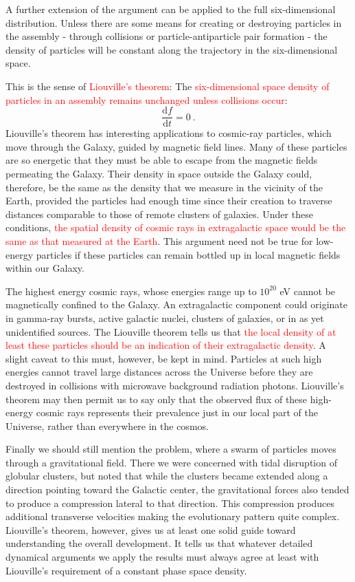 \documentclass[12pt,a4paper]{article}
\newcommand{\dif}{\mathrm{d}}
\newcounter{theo}[section]\setcounter{theo}{0}
\begin{document}
A further extension of the argument can be applied to the full six-dimensional distribution. Unless there are some means for creating or destroying particles in the assembly - through collisions or particle-antiparticle pair formation - the density of particles will be constant along the trajectory in the six-dimensional space. 

This is the sense of \textcolor{red}{Liouville's theorem}: The \textcolor{red}{six-dimensional space density of particles in an assembly remains unchanged unless collisions occur}:
\begin{equation}
\dfrac{\dif f}{\dif t} = 0 ~.
\end{equation}
Liouville's theorem has interesting applications to cosmic-ray particles, which move through the Galaxy, guided by magnetic field lines. Many of these particles are so energetic that they must be able to escape from the magnetic fields permeating the Galaxy. Their density in space outside the Galaxy could, therefore, be the same as the density that we measure in the vicinity of the Earth, provided the particles had enough time since their creation to traverse distances comparable to those of remote clusters of galaxies. Under these conditions, \textcolor{red}{the spatial density of cosmic rays in extragalactic space would be the same as that measured at the Earth}. This argument need not be true for low-energy particles if these particles can remain bottled up in local magnetic fields within our Galaxy.

The highest energy cosmic rays, whose energies range up to $10^{20}$ eV cannot be magnetically confined to the Galaxy. An extragalactic component could originate in gamma-ray bursts, active galactic nuclei, clusters of galaxies, or in as yet unidentified sources. The Liouville theorem tells us that \textcolor{red}{the local density of at least these particles should be an indication of their extragalactic density}. A slight caveat to this must, however, be kept in mind. Particles at such high energies cannot travel large distances across the Universe before they are destroyed in collisions with microwave background radiation photons. Liouville's theorem may then permit us to say only that the observed flux of these high-energy cosmic rays represents their prevalence just in our local part of the Universe, rather than everywhere in the cosmos.

Finally we should still mention the problem, where a swarm of particles moves through a gravitational field. There we were concerned with tidal disruption of globular clusters, but noted that while the clusters became extended along a direction pointing toward the Galactic center, the gravitational forces also tended to produce a compression lateral to that direction. This compression produces additional transverse velocities making the evolutionary pattern quite complex. Liouville's theorem, however, gives us at least one solid guide toward understanding the overall development. It tells us that whatever detailed dynamical arguments we apply the results must always agree at least with Liouville's requirement of a constant phase space density.
\end{document}
